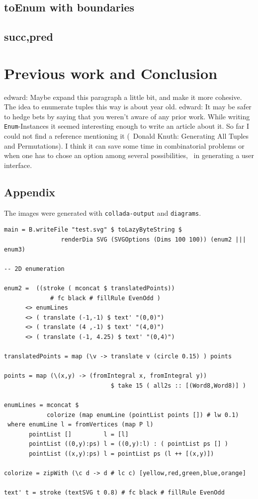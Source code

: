 \documentclass{tmr}
\newcommand{\authornote}[3]{{\color{#2} {\sc #1}: #3}}
\newcommand\bay[1]{\authornote{edward}{blue}{#1}}
\begin{document}
\subsection{toEnum with boundaries}

\subsection{succ,pred}


\section{Previous work and Conclusion}

\cite{auth:tuple-gen}
\cite{rationals}
\cite{knuth}

\bay{Maybe expand this paragraph a little bit, and make it more cohesive.}
The idea to enumerate tuples this way is about year old. \bay{It may be safer to hedge bets by saying that you weren't aware of any prior work.} While writing \verb|Enum|-Instances it seemed interesting enough to write an article about it. So far I could not find a reference mentioning it (\eg\ Donald Knuth: Generating All Tuples and Permutations). I think it can save some time in combinatorial problems or when one has to chose an option among several possibilities, \eg\ in generating a user interface.

\subsection{Appendix}

The images were generated with \verb|collada-output| and \verb|diagrams|.

\begin{verbatim}
main = B.writeFile "test.svg" $ toLazyByteString $
                renderDia SVG (SVGOptions (Dims 100 100)) (enum2 ||| enum3)

-- 2D enumeration

enum2 =  ((stroke ( mconcat $ translatedPoints)) 
             # fc black # fillRule EvenOdd )
      <> enumLines
      <> ( translate (-1,-1) $ text' "(0,0)")
      <> ( translate (4 ,-1) $ text' "(4,0)")
      <> ( translate (-1, 4.25) $ text' "(0,4)")

translatedPoints = map (\v -> translate v (circle 0.15) ) points

points = map (\(x,y) -> (fromIntegral x, fromIntegral y))
                              $ take 15 ( all2s :: [(Word8,Word8)] )

enumLines = mconcat $ 
            colorize (map enumLine (pointList points []) # lw 0.1)
 where enumLine l = fromVertices (map P l)
       pointList []         l = [l]
       pointList ((0,y):ps) l = ((0,y):l) : ( pointList ps [] )
       pointList ((x,y):ps) l = pointList ps (l ++ [(x,y)])

colorize = zipWith (\c d -> d # lc c) [yellow,red,green,blue,orange]

text' t = stroke (textSVG t 0.8) # fc black # fillRule EvenOdd
\end{verbatim}


\end{document}

